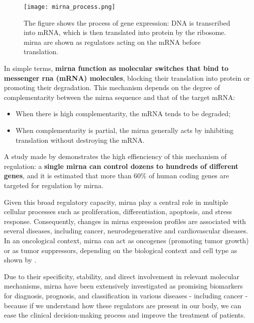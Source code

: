 \begin{figure}[h]
  \centering
  \texttt{[image: mirna\_process.png]}
  \caption{The figure shows the process of gene expression: DNA is transcribed
    into mRNA, which is then translated into protein by the ribosome. \gls{mirna}
    are shown as regulators acting on the mRNA before translation.}
  \label{fig:mirna_mechanism}
\end{figure}

In simple terms, \textbf{\gls{mirna} function as molecular switches that bind
  to messenger \gls{rna} (mRNA) molecules}, blocking their translation into
protein or promoting their degradation. This mechanism depends on the degree of
complementarity between the \gls{mirna} sequence and that of the target mRNA:

\begin{itemize}
  \item When there is high complementarity, the mRNA tends to be degraded;
  \item When complementarity is partial, the \gls{mirna} generally acts by inhibiting
        translation without destroying the mRNA.
\end{itemize}

A study made by \textcite{role_mirna_Calaf2023} demonstrates the high
effienciency of this mechanism of regulation: a \textbf{single \gls{mirna} can
  control dozens to hundreds of different genes}, and it is estimated that more
than $60\%$ of human coding genes are targeted for regulation by \gls{mirna}.

Given this broad regulatory capacity, \gls{mirna} play a central role in
multiple cellular processes such as proliferation, differentiation, apoptosis,
and stress response. Consequently, changes in \gls{mirna} expression profiles
are associated with several diseases, including cancer, neurodegenerative and
cardiovascular diseases. In an oncological context, \gls{mirna} can act as
oncogenes (promoting tumor growth) or as tumor suppressors, depending on the
biological context and cell type as shown by
\textcite{regulatory_mecha_mirnaGulyaeva2016}.

Due to their specificity, stability, and direct involvement in relevant
molecular mechanisms, \gls{mirna} have been extensively investigated as
promising biomarkers for diagnosis, prognosis, and classification in various
diseases - including cancer - because if we understand how these regulators
are present in our body, we can ease the clinical decision-making process and 
improve the treatment of patients.

